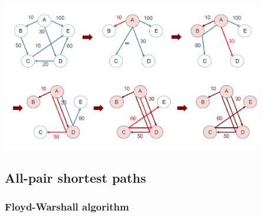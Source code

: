 \begin{center}
    \includegraphics[width=0.85\textwidth]{img/graphs/DijkstraGraph.png}
\end{center}

%

\subsection{All-pair shortest paths}

\subsubsection{Floyd-Warshall algorithm}